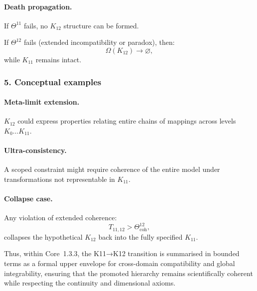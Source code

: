 \paragraph{Death propagation.}
If $\Theta^{11}$ fails, no $K_{12}$ structure can be formed.

If $\Theta^{12}$ fails (extended incompatibility or paradox), then:
\[
\Omega(K_{12}) \rightarrow \varnothing,
\]
while $K_{11}$ remains intact.

\subsubsection{5. Conceptual examples}

\paragraph{Meta-limit extension.}
$K_{12}$ could express properties relating entire chains of mappings across
levels $K_0\dots K_{11}$.

\paragraph{Ultra-consistency.}
A scoped constraint might require coherence of the entire model under
transformations not representable in $K_{11}$.

\paragraph{Collapse case.}
Any violation of extended coherence:
\[
T_{11,12} > \Theta^{12}_{\mathrm{coh}},
\]
collapses the hypothetical $K_{12}$ back into the fully specified $K_{11}$.

Thus, within Core~1.3.3, the K11→K12 transition is summarised in bounded
terms as a formal upper envelope for cross-domain compatibility and global
integrability, ensuring that the promoted hierarchy remains scientifically
coherent while respecting the continuity and dimensional axioms.
